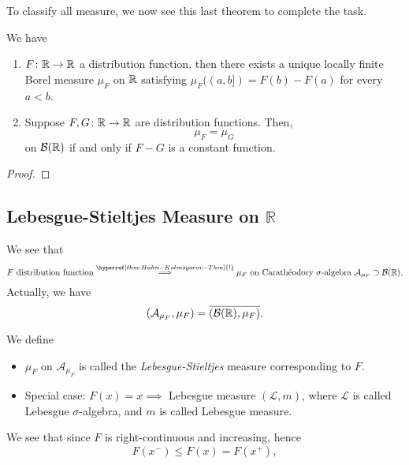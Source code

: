 To classify all measure, we now see this last theorem to complete the task.
\begin{theorem}
	We have
	\begin{enumerate}
		\item \(F\colon \mathbb{\MakeUppercase{r}} \to \mathbb{\MakeUppercase{r}} \) a distribution function, then there exists
		      a unique locally finite Borel measure \(\mu _F\) on \(\mathbb{\MakeUppercase{r}} \) satisfying \(\mu _F((a, b])=F(b)-F(a)\) for every \(a<b\).
		\item Suppose \(F, G\colon \mathbb{\MakeUppercase{r}} \to \mathbb{\MakeUppercase{r}} \) are distribution functions. Then,
		      \[
			      \mu _F = \mu _G
		      \]
		      on \(\mathcal{B} (\mathbb{\MakeUppercase{r}} )\) if and only if \(F-G\) is a constant function.
	\end{enumerate}
\end{theorem}
\begin{proof}
\end{proof}

\subsection{Lebesgue-Stieltjes Measure on \(\mathbb{R} \)}
We see that
\[
	F \text{ distribution function} \overset{\hyperref[thm:Hahn-Kolmogorov-Thm]{!}}{\implies } \mu _F \text{ on Carathéodory \(\sigma\)-algebra }\mathcal{A}_{\mu _F}\supset \mathcal{B} (\mathbb{\MakeUppercase{r}}) .
\]
Actually, we have
\[
	(\mathcal{A}_{\mu _F}, \mu _F) = \overline{(\mathcal{B} (\mathbb{\MakeUppercase{r}} ), \mu _F)}.
\]
\begin{definition}
	We define
	\begin{itemize}
		\item \(\mu _F\) on \(\mathcal{A} _{\mu _F}\) is called the \emph{Lebesgue-Stieltjes} measure corresponding to \(F\).
		\item Special case: \(F(x)=x\implies \) Lebesgue measure \((\mathcal{L} , m)\), where \(\mathcal{L} \) is called Lebesgue \(\sigma\)-algebra,
		      and \(m\) is called Lebesgue measure.
	\end{itemize}
\end{definition}

\begin{note}
	We see that since \(F\) is right-continuous and increasing, hence
	\[
		F(x^-)\leq F(x) = F(x^+),
	\]
\end{note}


